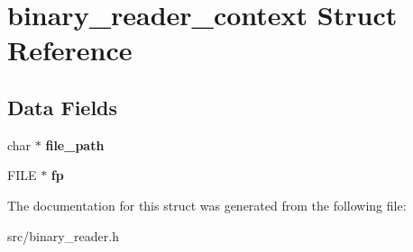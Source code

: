 \hypertarget{structbinary__reader__context}{}\section{binary\+\_\+reader\+\_\+context Struct Reference}
\label{structbinary__reader__context}
\subsection*{Data Fields}
\begin{DoxyCompactItemize}
\item 
\hypertarget{structbinary__reader__context_aaf5188db7bd1b10d72e292695ef77370}{}char $\ast$ {\bfseries file\+\_\+path}\label{structbinary__reader__context_aaf5188db7bd1b10d72e292695ef77370}

\item 
\hypertarget{structbinary__reader__context_a052cc28d7cfcef396a9f58b65b95db68}{}F\+I\+L\+E $\ast$ {\bfseries fp}\label{structbinary__reader__context_a052cc28d7cfcef396a9f58b65b95db68}

\end{DoxyCompactItemize}


The documentation for this struct was generated from the following file\+:\begin{DoxyCompactItemize}
\item 
src/binary\+\_\+reader.\+h\end{DoxyCompactItemize}
